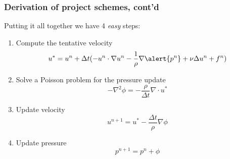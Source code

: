 \begin{frame}
\frametitle{Derivation of project schemes, cont'd}
Putting it all together we have 4 \emph{easy} steps: 
\begin{enumerate}
\item Compute the tentative velocity 
\[   
u^{*} = u^n + \Delta t ( -u^n \cdot \nabla u^n
    -\frac{1}{\rho}\nabla \alert{p^n}  + \nu \Delta u^n + f^n) 
\]
\item Solve a Poisson problem for the pressure update 
\[
-\nabla^2 \phi =  - \frac{\rho}{\Delta t} \nabla \cdot u^*  
\]

\item Update velocity
\[
u^{n+1} =  u^*- \frac{\Delta t}{\rho} \nabla \phi 
\]

\item Update pressure
\[
p^{n+1} = p^n + \phi 
\]
\end{enumerate}
\end{frame}
